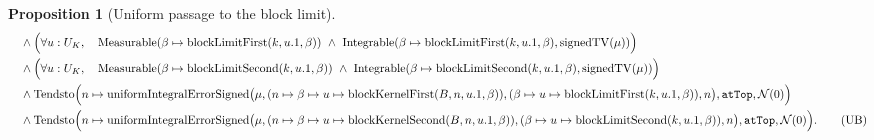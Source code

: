 \documentclass[9pt]{extarticle}
\newtheorem{proposition}[lemma]{Proposition}
\theoremstyle{definition}
\theoremstyle{remark}
\begin{document}
\begin{proposition}[Uniform passage to the block limit]
\begin{align*}
&\quad\wedge
 \Bigl(\forall u:U_K,\quad
 \operatorname{Measurable}
  (\beta\mapsto\operatorname{blockLimitFirst}(k,u.1,\beta))\ \wedge\
 \operatorname{Integrable}
  (\beta\mapsto\operatorname{blockLimitFirst}(k,u.1,\beta),
    \operatorname{signedTV}(\mu))\Bigr)\\
&\quad\wedge
 \Bigl(\forall u:U_K,\quad
 \operatorname{Measurable}
  (\beta\mapsto\operatorname{blockLimitSecond}(k,u.1,\beta))\ \wedge\
 \operatorname{Integrable}
  (\beta\mapsto\operatorname{blockLimitSecond}(k,u.1,\beta),
    \operatorname{signedTV}(\mu))\Bigr)\\
&\quad\wedge
 \operatorname{Tendsto}\Bigl(
 n\mapsto\operatorname{uniformIntegralErrorSigned}
  \bigl(\mu,
   (n\mapsto\beta\mapsto u\mapsto
     \operatorname{blockKernelFirst}(B,n,u.1,\beta)),
   (\beta\mapsto u\mapsto\operatorname{blockLimitFirst}(k,u.1,\beta)),n\bigr),
 \texttt{atTop},\mathcal N(0)\Bigr)\\
&\quad\wedge
 \operatorname{Tendsto}\Bigl(
 n\mapsto\operatorname{uniformIntegralErrorSigned}
  \bigl(\mu,
   (n\mapsto\beta\mapsto u\mapsto
     \operatorname{blockKernelSecond}(B,n,u.1,\beta)),
   (\beta\mapsto u\mapsto\operatorname{blockLimitSecond}(k,u.1,\beta)),n\bigr),
 \texttt{atTop},\mathcal N(0)\Bigr).
 \tag{UB}\label{eq:uniform-block-integral-limit}
\end{align*}
\end{proposition}
\end{document}
